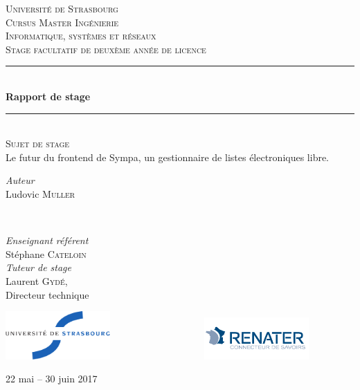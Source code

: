 \documentclass[]{article}
\begin{document}
\begin{titlepage}
	\newcommand{\HRule}{\rule{\linewidth}{0.5mm}}
	
	\center
	\textsc{\LARGE Université de Strasbourg}\\[1.5cm]
	\textsc{\Large Cursus Master Ingénierie \\ Informatique, systèmes et réseaux}\\[0.5cm]
	\textsc{\large Stage facultatif de deuxème année de licence}\\[0.5cm]
	
	\HRule\\[0.4cm]
	{\huge\bfseries Rapport de stage}\\[0.4cm]
	\HRule\\[1.5cm]

	\textsc{\large Sujet de stage}\\[0.5cm]
	Le futur du frontend de Sympa, un gestionnaire de listes électroniques libre.
	\vfill

	\begin{minipage}{0.4\textwidth}
		\begin{flushleft}
			\large
			\textit{Auteur}\\
			Ludovic \textsc{Muller}
		\end{flushleft}
	\end{minipage}
	~
	\begin{minipage}{0.4\textwidth}
		\begin{flushright}
			\large
			\textit{Enseignant référent}\\
			Stéphane \textsc{Cateloin}\\
			\vfill
			\textit{Tuteur de stage}\\
			Laurent \textsc{Gydé},\\
      Directeur technique
		\end{flushright}
	\end{minipage}
    
	\vfill\vfill
	\includegraphics[width=0.3\textwidth]{../images/logos/unistra.png}
	\includegraphics[width=0.3\textwidth]{../images/logos/renater.png}
	\vfill
		
	\vfill\vfill
	
	22 mai – 30 juin 2017
	
\end{titlepage}
\end{document}
